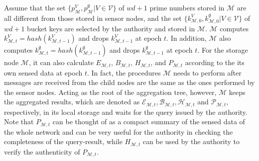 \documentclass[conference]{IEEEtran}
\begin{document}
Assume that the set $\{p_{\mathcal{M}}^{V},p_{\mathcal{M}}^{\emptyset}|V\in\mathcal{V}\}$ of $wd+1$ prime numbers stored in $\mathcal{M}$ are all different from those stored in sensor nodes, and the set $\{k_{\mathcal{M},0}^{V},k_{\mathcal{M},0}^{\emptyset}|V\in\mathcal{V}\}$ of $wd+1$ bucket keys are selected by the authority and stored in $\mathcal{M}$. $\mathcal{M}$ computes $k_{\mathcal{M},t}^{V}=hash(k_{\mathcal{M},t-1}^{V})$ and drops $k_{\mathcal{M},t-1}^{V}$ at epoch $t$. In addition, $\mathcal{M}$ also computes $k_{\mathcal{M},t}^{\emptyset}=hash(k_{\mathcal{M},t-1}^{\emptyset})$ and drops $k_{\mathcal{M},t-1}^{\emptyset}$ at epoch $t$. For the storage node $\mathcal{M}$, it can also calculate $E_{\mathcal{M},t}$, $B_{\mathcal{M},t}$, $H_{\mathcal{M},t}$, and $P_{\mathcal{M},t}$ according to the its own sensed data at epoch $t$. In fact, the procedures $\mathcal{M}$ needs to perform after messages are received from the child nodes are the same as the ones performed by the sensor nodes. Acting as the root of the aggregation tree, however, $\mathcal{M}$ keeps the aggregated results, which are denoted as $\mathcal{E}_{\mathcal{M},t},\mathcal{B}_{\mathcal{M},t},\mathcal{H}_{\mathcal{M},t}$ and $\mathcal{P}_{\mathcal{M},t}$, respectively, in its local storage and waits for the query issued by the authority. Note that $P_{\mathcal{M},t}$ can be thought of as a compact summary of the sensed data of the whole network and can be very useful for the authority in checking the completeness of the query-result, while $H_{\mathcal{M},t}$ can be used by the authority to verify the authenticity of $P_{\mathcal{M},t}$.
\end{document}
